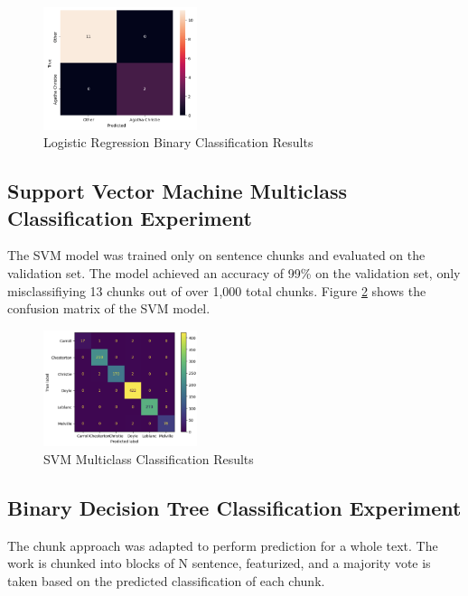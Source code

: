 \documentclass[journal]{IEEEtran} %
\begin{document}
\begin{figure}[h!]
    \caption{Logistic Regression Binary Classification Results}
    \begin{center}
    \centerline{\includegraphics[width=0.4\textwidth]{./logreg.png}}
    \end{center}
    \centering
    \label{logreg}
\end{figure}

\subsection{Support Vector Machine Multiclass Classification Experiment}

The SVM model was trained only on sentence chunks and evaluated on the validation set. The model achieved an accuracy of 99\% on the validation set, only misclassifiying 13 chunks out of over 1,000 total chunks. Figure \ref{svm} shows the confusion matrix of the SVM model.

\begin{figure}
    \caption{SVM Multiclass Classification Results}
    \begin{center}
    \centerline{\includegraphics[width=0.4\textwidth]{./svm.png}}
    \end{center}
    \centering
    \label{svm}
\end{figure}

\subsection{Binary Decision Tree Classification Experiment}

The chunk approach was adapted to perform prediction for a whole text. The work is chunked into blocks of N sentence, featurized, and a majority vote is taken based on the predicted classification of each chunk.
\end{document}
